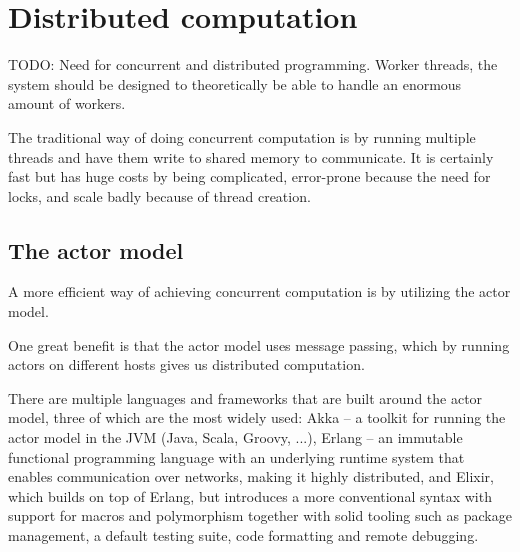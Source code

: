 \section{Distributed computation}


TODO: Need for concurrent and distributed programming. Worker threads, the system should be designed to theoretically be able to handle an enormous amount of workers.

The traditional way of doing concurrent computation is by running multiple threads and have them write to shared memory to communicate. It is certainly fast but has huge costs by being complicated, error-prone because the need for locks, and scale badly because of thread creation. %


\subsection{The actor model}

A more efficient way of achieving concurrent computation is by utilizing the actor model. %

One great benefit is that the actor model uses message passing, which by running actors on different hosts gives us distributed computation.

There are multiple languages and frameworks that are built around the actor model, three of which are the most widely used: Akka -- a toolkit for running the actor model in the JVM (Java, Scala, Groovy, ...), Erlang -- an immutable functional programming language with an underlying runtime system that enables communication over networks, making it highly distributed, and Elixir, which builds on top of Erlang, but introduces a more conventional syntax with support for macros and polymorphism together with solid tooling such as package management, a default testing suite, code formatting and remote debugging.




